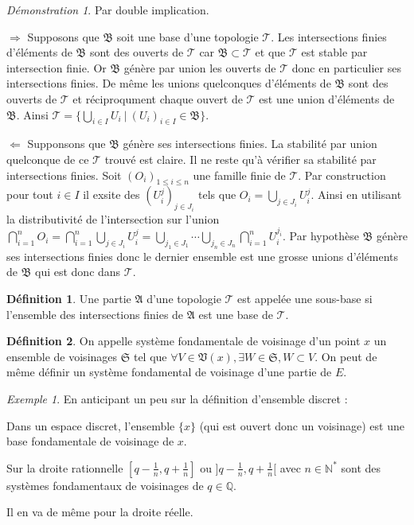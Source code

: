 \documentclass[a4paper, 11pt, french]{book}
\newenvironment{itemise}{\itemize}{\enditemize}
\theoremstyle{plain} %
\theoremstyle{definition} %
\newtheorem{definition}{Définition}
\theoremstyle{remark} %
\newtheorem{exemple}{Exemple}
\newtheorem*{demonstration}{Démonstration}
\newcommand{\1}{\mathds{1}}
\newcommand{\N}{\mathbb{N}}
\newcommand{\Q}{\mathbb{Q}}
\renewcommand{\frak}[1]{\mathfrak{#1}}
\newcommand{\scr}[1]{\mathscr{#1}}
\newcommand\ens[2]{\{#1 \ |\ #2\}}
\newcommand\equivalence[3]{
	\begin{demonstration}
		#1
		\begin{itemise}
			\item[$\Longrightarrow$] #2
			\item[$\Longleftarrow$] #3
		\end{itemise}
	\end{demonstration}
}
\begin{document}
\equivalence{Par double implication.}{
	Supposons que $\frak{B}$ soit une base d'une topologie $\scr{T}$.
	Les intersections finies d'éléments de $\frak{B}$ sont des ouverts de $\scr{T}$ car $\frak{B}\subset\scr{T}$ et que $\scr{T}$ est stable par intersection finie.
	Or $\frak{B}$ génère par union les ouverts de $\scr{T}$ donc en particulier ses intersections finies.
	De même les unions quelconques d'éléments de $\frak{B}$ sont des ouverts de $\scr{T}$ et réciproqument chaque ouvert de $\scr{T}$ est une union d'éléments de $\frak{B}$.
	Ainsi $\scr{T}=\ens{\bigcup_{i\in I}U_i}{(U_i)_{i\in I}\in\frak{B}}$.
}{
	Supponsons que $\frak{B}$ génère ses intersections finies.
	La stabilité par union quelconque de ce $\scr{T}$ trouvé est claire.
	Il ne reste qu'à vérifier sa stabilité par intersections finies.
	Soit $(O_i)_{1\leqslant i\leqslant n}$ une famille finie de $\scr{T}$.
	Par construction pour tout $i\in I$ il exsite des $(U_i^j)_{j\in J_i}$ tels que $O_i=\bigcup_{j\in J_i}U_i^j$.
	Ainsi en utilisant la distributivité de l'intersection sur l'union $\bigcap_{i=1}^nO_i
	=\bigcap_{i=1}^n\bigcup_{j\in J_i}U_i^j
	=\bigcup_{j_1\in J_1}\cdots\bigcup_{j_n\in J_n}\bigcap_{i=1}^nU_i^{j_i}$.
	Par hypothèse $\frak{B}$ génère ses intersections finies donc le dernier ensemble est une grosse unions d'éléments de $\frak{B}$ qui est donc dans $\scr{T}$.
}

\begin{definition}
	Une partie $\frak{A}$ d'une topologie $\scr{T}$ est appelée une sous-base si l’ensemble des intersections finies de $\frak{A}$ est une base de $\scr{T}$.
\end{definition}

\begin{definition}
	On appelle système fondamentale de voisinage d'un point $x$ un ensemble de voisinages $\frak{S}$ tel que $\forall V\in\frak{V}(x), \exists W\in\frak{S}, W\subset V$. On peut de même définir un système fondamental de voisinage d'une partie de $E$.
\end{definition}

\begin{exemple}
	En anticipant un peu sur la définition d'ensemble discret :
	\begin{itemise}
		\item Dans un espace discret, l'ensemble $\{x\}$ (qui est ouvert donc un voisinage) est une base fondamentale de voisinage de $x$.
		\item Sur la droite rationnelle $[q-\frac{1}{n}, q+\frac{1}{n}]$ ou $]q-\frac{1}{n}, q+\frac{1}{n}[$ avec $n\in\N^*$ sont des systèmes fondamentaux de voisinages de $q\in\Q$.
		\item Il en va de même pour la droite réelle.
	\end{itemise}
\end{exemple}
\end{document}

